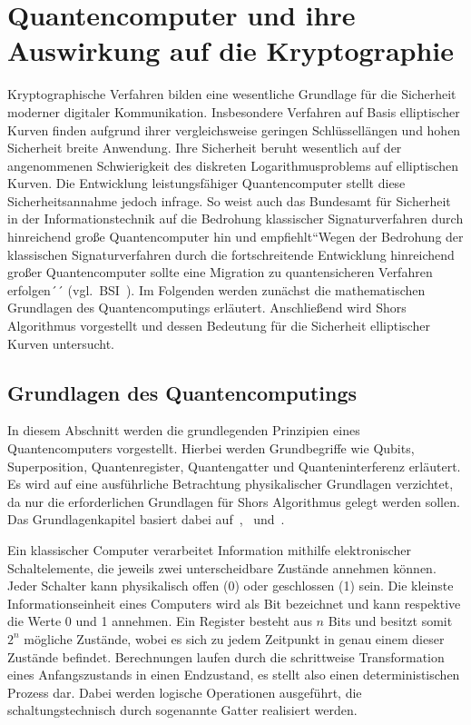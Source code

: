 \chapter{Quantencomputer und ihre Auswirkung auf die Kryptographie}
Kryptographische Verfahren bilden eine wesentliche Grundlage für die Sicherheit moderner digitaler Kommunikation. Insbesondere Verfahren auf Basis elliptischer Kurven finden aufgrund ihrer vergleichsweise geringen Schlüssellängen und hohen Sicherheit breite Anwendung. Ihre Sicherheit beruht wesentlich auf der angenommenen Schwierigkeit des diskreten Logarithmusproblems auf elliptischen Kurven. Die Entwicklung leistungsfähiger Quantencomputer stellt diese Sicherheitsannahme jedoch infrage. So weist auch das Bundesamt für Sicherheit in der Informationstechnik auf die Bedrohung klassischer Signaturverfahren durch hinreichend große Quantencomputer hin und empfiehlt``Wegen der Bedrohung der klassischen Signaturverfahren durch die fortschreitende Entwicklung hinreichend großer Quantencomputer sollte eine Migration zu quantensicheren Verfahren erfolgen´´ (vgl.~BSI~\cite[S.59]{bundesamt26}). Im Folgenden werden zunächst die mathematischen Grundlagen des Quantencomputings erläutert. Anschließend wird Shors Algorithmus vorgestellt und dessen Bedeutung für die Sicherheit elliptischer Kurven untersucht.
\section{Grundlagen des Quantencomputings}
In diesem Abschnitt werden die grundlegenden Prinzipien eines Quantencomputers vorgestellt. Hierbei werden Grundbegriffe wie Qubits, Superposition, Quantenregister, Quantengatter und Quanteninterferenz erläutert. Es wird auf eine ausführliche Betrachtung physikalischer Grundlagen verzichtet, da nur die erforderlichen Grundlagen für Shors Algorithmus gelegt werden sollen. Das Grundlagenkapitel basiert dabei auf~\cite[S.227--229]{buell24},~\cite[S.107--111,115]{bewer26} und~\cite[S.7]{shor97}.

Ein klassischer Computer verarbeitet Information mithilfe elektronischer Schaltelemente, die jeweils zwei unterscheidbare Zustände annehmen können. Jeder Schalter kann physikalisch offen (0) oder geschlossen (1) sein. Die kleinste Informationseinheit eines Computers wird als Bit bezeichnet und kann respektive die Werte 0 und 1 annehmen. Ein Register besteht aus $n$ Bits und besitzt  somit $2^n$ mögliche Zustände, wobei es sich zu jedem Zeitpunkt in genau einem dieser Zustände befindet. Berechnungen laufen durch die schrittweise Transformation eines Anfangszustands in einen Endzustand, es stellt also einen deterministischen Prozess dar. Dabei werden logische Operationen ausgeführt, die schaltungstechnisch durch sogenannte Gatter realisiert werden.

